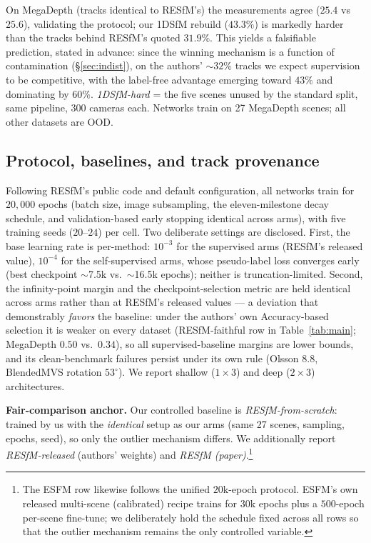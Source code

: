 \documentclass[10pt,twocolumn,letterpaper]{article}
\renewcommand{\deg}{^{\circ}}
\begin{document}
On MegaDepth (tracks identical to RESfM's) the measurements agree ($25.4$ vs $25.6$),
validating the protocol; our 1DSfM rebuild ($43.3\%$) is markedly harder than the tracks
behind RESfM's quoted $31.9\%$. This yields a falsifiable prediction, stated in advance:
since the winning mechanism is a function of contamination (\S\ref{sec:indist}), on the
authors' ${\sim}32\%$ tracks we expect supervision to be competitive, with the label-free
advantage emerging toward $43\%$ and dominating by $60\%$. \emph{1DSfM-hard} = the five
scenes unused by the standard split, same pipeline, $300$ cameras each. Networks train on
27 MegaDepth scenes; all other datasets are OOD.

\subsection{Protocol, baselines, and track provenance}\label{sec:protocol}
Following RESfM's public code and default configuration, all networks train for
$20{,}000$ epochs (batch size, image subsampling, the eleven-milestone decay schedule,
and validation-based early stopping identical across arms), with five training seeds
($20$--$24$) per cell. Two deliberate settings are disclosed. First, the base learning
rate is per-method: $10^{-3}$ for the supervised arms (RESfM's released value),
$10^{-4}$ for the self-supervised arms, whose pseudo-label loss converges early (best
checkpoint ${\sim}$7.5k vs.\ ${\sim}$16.5k epochs); neither is truncation-limited.
Second, the infinity-point margin and the checkpoint-selection metric are held identical
across arms rather than at RESfM's released values --- a deviation that demonstrably
\emph{favors} the baseline: under the authors' own Accuracy-based selection it is
weaker on every dataset (RESfM-faithful row in Table~\ref{tab:main}; MegaDepth $0.50$
vs.\ $0.34$), so all supervised-baseline margins are lower bounds, and its
clean-benchmark failures persist under its own rule (Olsson $8.8$, BlendedMVS rotation
$53\deg$). We report shallow ($1{\times}3$) and deep ($2{\times}3$) architectures.

\noindent\textbf{Fair-comparison anchor.} Our controlled baseline is
\emph{RESfM-from-scratch}: trained by us with the \emph{identical} setup as our arms (same
27 scenes, sampling, epochs, seed), so only the outlier mechanism differs. We additionally
report \emph{RESfM-released} (authors' weights) and \emph{RESfM (paper)}.\footnote{The
ESFM row likewise follows the unified $20$k-epoch protocol. ESFM's own released
multi-scene (calibrated) recipe trains for $30$k epochs plus a $500$-epoch per-scene
fine-tune; we deliberately hold the schedule fixed across all rows so that the outlier
mechanism remains the only controlled variable.}
\end{document}
